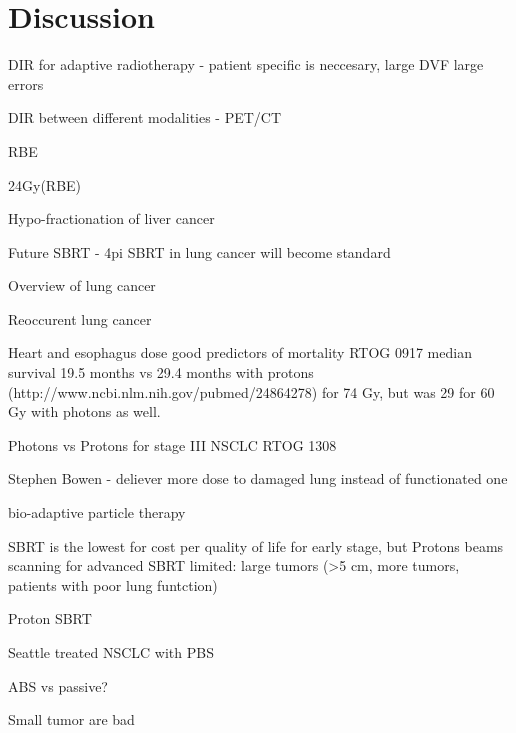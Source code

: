 \documentclass[type=dr, dr=rernat, accentcolor=tud7b,colorbacktitle, bigchapter, openright, twoside, 12pt ]{tudthesis}
\begin{document}
\chapter{Discussion}



DIR for adaptive radiotherapy - patient specific is neccesary, large DVF large errors %

DIR between different modalities - PET/CT %

RBE

24Gy(RBE) %

Hypo-fractionation of liver cancer %

Future SBRT - 4pi %
SBRT in lung cancer will become standard 

Overview of lung cancer %

Reoccurent lung cancer %

Heart and esophagus dose good predictors of mortality RTOG 0917 median survival 19.5 months vs 29.4 months with protons (http://www.ncbi.nlm.nih.gov/pubmed/24864278) for 74 Gy, but was 29 for 60 Gy with photons as well.

Photons vs Protons for stage III NSCLC RTOG 1308

Stephen Bowen - deliever more dose to damaged lung instead of functionated one

bio-adaptive particle therapy

SBRT is the lowest for cost per quality of life for early stage, but Protons beams scanning for advanced %
SBRT limited: large tumors (>5 cm, more tumors, patients with poor lung funtction)

Proton SBRT %

Seattle treated NSCLC with PBS

ABS vs passive?

Small tumor are bad %


{}
% 
\end{document}
